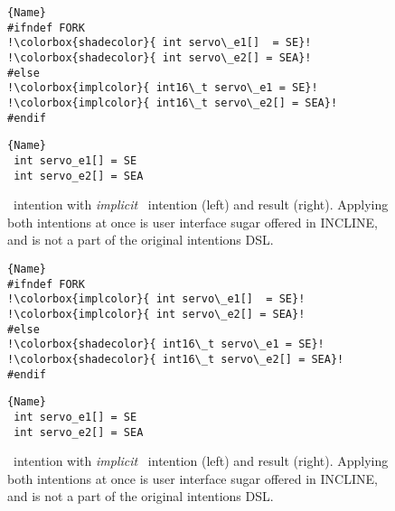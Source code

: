 \begin{figure}[ht]
    \centering
    \begin{minipage}{.35\textwidth}
\begin{lstlisting}[caption=Wrapped code by PC,escapechar=!]{Name}
#ifndef FORK
!\colorbox{shadecolor}{ int servo\_e1[]  = SE}!
!\colorbox{shadecolor}{ int servo\_e2[] = SEA}!
#else
!\colorbox{implcolor}{ int16\_t servo\_e1 = SE}!
!\colorbox{implcolor}{ int16\_t servo\_e2[] = SEA}!
#endif
\end{lstlisting}
\end{minipage}\qquad
\begin{minipage}{.35\textwidth}
\begin{lstlisting}[caption=Unwrapped code,escapechar=!]{Name}
 int servo_e1[] = SE
 int servo_e2[] = SEA
\end{lstlisting}
    \end{minipage}
    \caption{\colorbox{shadecolor}{\keep}~intention with \textit{implicit} \colorbox{implcolor}{\remove}~intention (left) and result (right). Applying both intentions at once is user interface sugar offered in INCLINE, and is not a part of the original intentions DSL.}
    \label{fig:keep-impl}
\end{figure}

\begin{figure}[ht]
    \centering
    \begin{minipage}{.35\textwidth}
\begin{lstlisting}[caption=Wrapped code by PC,escapechar=!]{Name}
#ifndef FORK
!\colorbox{implcolor}{ int servo\_e1[]  = SE}!
!\colorbox{implcolor}{ int servo\_e2[] = SEA}!
#else
!\colorbox{shadecolor}{ int16\_t servo\_e1 = SE}!
!\colorbox{shadecolor}{ int16\_t servo\_e2[] = SEA}!
#endif
\end{lstlisting}
\end{minipage}\qquad
\begin{minipage}{.35\textwidth}
\begin{lstlisting}[caption=Unwrapped code,escapechar=!]{Name}
 int servo_e1[] = SE
 int servo_e2[] = SEA
\end{lstlisting}
    \end{minipage}
    \caption{\colorbox{shadecolor}{\remove}~intention with \textit{implicit} \colorbox{implcolor}{\keep}~intention (left) and result (right). Applying both intentions at once is user interface sugar offered in INCLINE, and is not a part of the original intentions DSL.}
    \label{fig:remove-impl}
\end{figure}

